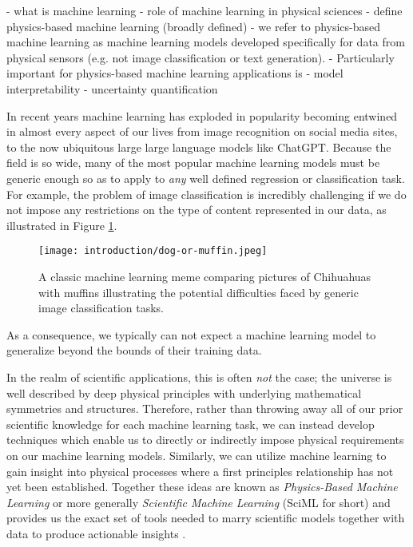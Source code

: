 - what is machine learning
- role of machine learning in physical sciences
- define physics-based machine learning (broadly defined)
   - we refer to physics-based machine learning as machine learning models
   developed specifically for data from physical sensors (e.g. not image
   classification or text generation).
   - Particularly important for physics-based machine learning applications is
   - model interpretability
   - uncertainty quantification

In recent years machine learning has exploded in popularity becoming entwined in
almost every aspect of our lives from image recognition on social media sites,
to the now ubiquitous large large language models like ChatGPT. Because the
field is so wide, many of the most popular machine learning models must be
generic enough so as to apply to \textit{any} well defined regression or
classification task. For example, the problem of image classification is
incredibly challenging if we do not impose any restrictions on the type of
content represented in our data, as illustrated in Figure
\ref{fig:dog-or-muffin}.

\begin{figure}[!hbt]
  \centering
  \texttt{[image: introduction/dog-or-muffin.jpeg]}
  \caption{A classic machine learning meme comparing pictures of Chihuahuas with muffins illustrating the potential difficulties faced by generic image classification tasks.}
  \label{fig:dog-or-muffin}
\end{figure}
As a consequence, we typically can not expect a machine learning model to
generalize beyond the bounds of their training data.


In the realm of scientific applications, this is often \textit{not} the case;
the universe is well described by deep physical principles with underlying
mathematical symmetries and structures. Therefore, rather than throwing away all
of our prior scientific knowledge for each machine learning task, we can instead
develop techniques which enable us to directly or indirectly impose physical
requirements on our machine learning models. Similarly, we can utilize machine
learning to gain insight into physical processes where a first principles
relationship has not yet been established. Together these ideas are known as
\textit{Physics-Based Machine Learning} or more generally \textit{Scientific
  Machine Learning} (SciML for short) and provides us the exact set of tools
needed to marry scientific models together with data to produce actionable
insights \cite{rackauckas2020universal}.

